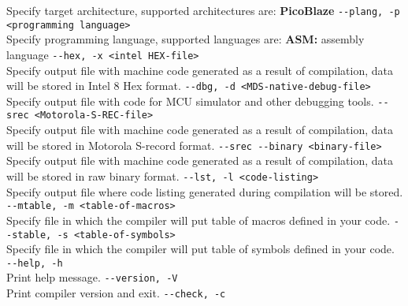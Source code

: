             Specify target architecture, supported architectures are: \textbf{PicoBlaze}
            {
                \usecodefont
                \verb'--plang, -p <programming language>'\\
            }
            Specify programming language, supported languages are: \textbf{ASM:} assembly language
            {
                \usecodefont
                \verb'--hex, -x <intel HEX-file>'\\
            }
            Specify output file with machine code generated as a result of compilation, data will be stored in Intel 8 Hex format.
            {
                \usecodefont
                \verb'--dbg, -d <MDS-native-debug-file>'\\
            }
            Specify output file with code for MCU simulator and other debugging tools.
            {
                \usecodefont
                \verb'--srec <Motorola-S-REC-file>'\\
            }
            Specify output file with machine code generated as a result of compilation, data will be stored in Motorola S-record format.
            {
                \usecodefont
                \verb'--srec --binary <binary-file>'\\
            }
            Specify output file with machine code generated as a result of compilation, data will be stored in raw binary format.
            {
                \usecodefont
                \verb'--lst, -l <code-listing>'\\
            }
            Specify output file where code listing generated during compilation will be stored.
            {
                \usecodefont
                \verb'--mtable, -m <table-of-macros>'\\
            }
            Specify file in which the compiler will put table of macros defined in your code.
            {
                \usecodefont
                \verb'--stable, -s <table-of-symbols>'\\
            }
            Specify file in which the compiler will put table of symbols defined in your code.
            {
                \usecodefont
                \verb'--help, -h'\\
            }
            Print help message.
            {
                \usecodefont
                \verb'--version, -V'\\
            }
            Print compiler version and exit.
            {
                \usecodefont
                \verb'--check, -c'\\
            }
